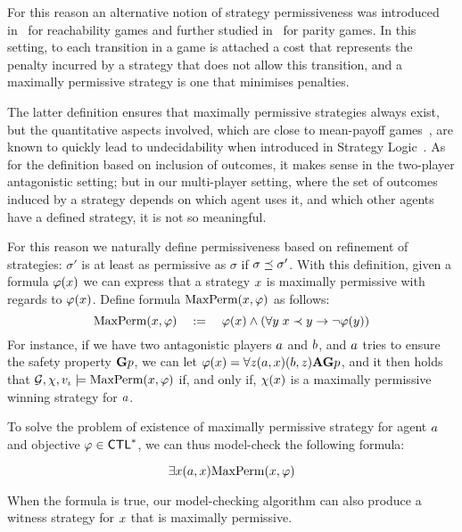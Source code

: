 For this reason an alternative notion of strategy
permissiveness was introduced in~\cite{bouyer2009measuring} for
reachability games and further studied in~\cite{bouyer2011measuring}
for parity games. In this setting, to each transition in a game is
attached a cost that represents the penalty incurred by a strategy
that does not allow this transition, and a maximally permissive
strategy is one that minimises penalties.

The latter definition ensures that
maximally permissive strategies always exist, but the quantitative
aspects involved, which are close to mean-payoff
games~\cite{ehrenfeucht1979positional,gurvich1988cyclic}, are known to
quickly lead to undecidability when introduced in Strategy Logic~\cite{gardy2017semantics}.
As for the definition based on inclusion of outcomes, it makes sense in the
two-player antagonistic setting; but in our multi-player setting, where the set of
outcomes induced by a strategy depends on which agent uses it, and
which other agents have a defined strategy, it is not so meaningful.

For this reason we naturally define permissiveness based on refinement
of strategies: $\sigma'$ is at least as permissive as $\sigma$ if $\sigma\refines\sigma'$.
With this definition, given a formula $\phi(\var)$ we can express that a strategy $\var$
  is maximally permissive with regards to  $\phi(\var)$. Define formula $\maxperm(\var,\phi)$ as
  follows:
  \[\maxperm(\var,\phi) \quad := \quad \phi(\var) \wedge (\forall \varb \;
    \var \refinesstr \varb \impl \neg \phi(\varb))\]
  For instance, if we have two antagonistic players $\ag$ and $\agb$,
  and $\ag$ tries to ensure the safety property $\always p$, we can let $\phi(\var)=\forall \varc
  \bind[\ag]{\var}\bind[\agb]{\varc}\A\always p$, and it then holds that
  $\CGS,\assign,\pos_\init\models \maxperm(\var,\phi)$ if, and only
  if, $\assign(\var)$ is a maximally permissive winning strategy for $\ag$.

To solve the problem of existence of maximally permissive strategy for
agent $\ag$ and objective $\phi\in\CTLs$,  we can thus model-check the
following \SLref formula:

\[\exists\var (\ag,\var) \maxperm(\var,\phi)\]

When the formula is true, our model-checking algorithm can also
produce a witness strategy for $\var$ that is maximally permissive.


